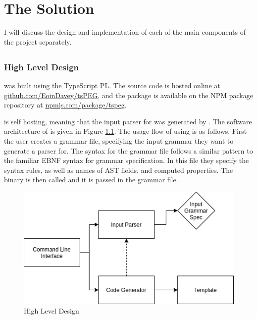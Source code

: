 \chapter{The Solution}

I will discuss the design and implementation of each of the main components of the project separately.

\section{\tsPEG{}}

\subsection{High Level Design}

\tsPEG{} was built using the TypeScript PL. The source code is hosted online at\\
\href{https://github.com/EoinDavey/tsPEG}{github.com/EoinDavey/tsPEG}, and the \tsPEG{} package is available on the NPM package repository at \href{https://www.npmjs.com/package/tspeg}{npmjs.com/package/tspeg}.

\tsPEG{} is self hosting, meaning that the input parser for \tsPEG{} was generated by \tsPEG{}. The software architecture of \tsPEG{} is given in Figure \ref{tspegdiagram}. The usage flow of using \tsPEG{} is as follows. First the user creates a grammar file, specifying the input grammar they want to generate a parser for. The syntax for the grammar file follows a similar pattern to the familiar EBNF syntax for grammar specification. In this file they specify the syntax rules, as well as names of AST fields, and computed properties. The \tsPEG{} binary is then called and it is passed in the grammar file.

\begin{figure}
    \caption{\tsPEG{} High Level Design}
    \label{tspegdiagram}
    \begin{center}
    \includegraphics[scale=0.75]{tspegdiagram}
    \end{center}
\end{figure}

